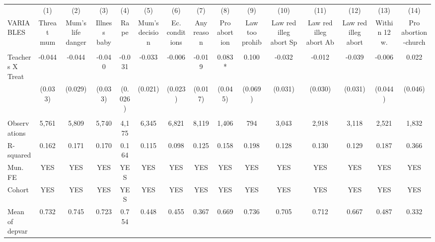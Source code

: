 \begin{tabular}{lcccccccccccccc} \hline
 & (1) & (2) & (3) & (4) & (5) & (6) & (7) & (8) & (9) & (10) & (11) & (12) & (13) & (14) \\
VARIABLES & Threat mum & Mum's life danger & Illness baby & Rape & Mum's decision & Ec. conditions & Any reason & Pro abortion & Law too prohib & Law red illeg abort Sp & Law red illeg abort Ab & Law red illeg abort & Within 12 w. & Pro abortion-church \\ \hline
 &  &  &  &  &  &  &  &  &  &  &  &  &  &  \\
Teachers X Treat & -0.044 & -0.044 & -0.040 & -0.031 & -0.033 & -0.006 & -0.019 & 0.083* & 0.100 & -0.032 & -0.012 & -0.039 & -0.006 & 0.022 \\
 & (0.033) & (0.029) & (0.033) & (0.026) & (0.021) & (0.023) & (0.017) & (0.045) & (0.069) & (0.031) & (0.030) & (0.031) & (0.044) & (0.046) \\
 &  &  &  &  &  &  &  &  &  &  &  &  &  &  \\
Observations & 5,761 & 5,809 & 5,740 & 4,175 & 6,345 & 6,821 & 8,119 & 1,406 & 794 & 3,043 & 2,918 & 3,118 & 2,521 & 1,832 \\
R-squared & 0.162 & 0.171 & 0.170 & 0.164 & 0.115 & 0.098 & 0.125 & 0.158 & 0.198 & 0.128 & 0.130 & 0.129 & 0.187 & 0.366 \\
Mun. FE & YES & YES & YES & YES & YES & YES & YES & YES & YES & YES & YES & YES & YES & YES \\
Cohort & YES & YES & YES & YES & YES & YES & YES & YES & YES & YES & YES & YES & YES & YES \\
 Mean of depvar & 0.732 & 0.745 & 0.723 & 0.754 & 0.448 & 0.455 & 0.367 & 0.669 & 0.736 & 0.705 & 0.712 & 0.667 & 0.487 & 0.332 \\ \hline
\end{tabular}
